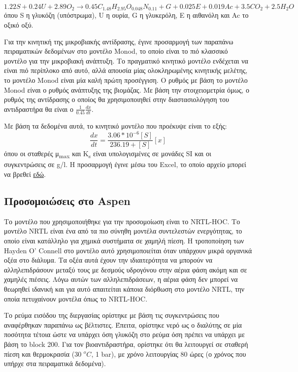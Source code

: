 \documentclass[11pt]{article}
\begin{document}
\[ 1.22 S + 0.24U + 2.89 O_2 \rightarrow 0.45 C_{1.48}H_{2.95}O_{0.048}N_{0.11} + G + 0.025E + 0.019Ac + 3.5CO_2 + 2.5H_2O \]
όπου S η γλυκόζη (υπόστρωμα), U η ουρία, G η γλυκερόλη, Ε η αιθανόλη και Ac το οξικό οξύ.

Για την κινητική της μικροβιακής αντίδρασης, έγινε προσαρμογή των παραπάνω πειραματικών δεδομένων στο μοντέλο Monod, το οποίο είναι το πιό κλασσικό μοντέλο για την μικροβιακή ανάπτυξη. Το πραγματικό κινητικό μοντέλο ενδέχεται να είναι πιό περίπλοκο από αυτό, αλλά απουσία μίας ολοκληρωμένης κινητικής μελέτης, το μοντέλο Monod είναι μία καλή πρώτη προσέγγιση. Ο ρυθμός με βάση το μοντέλο Monod είναι ο ρυθμός ανάπτυξης της βιομάζας. Με βάση την στοιχειομετρία όμως, ο ρυθμός της αντίδρασης ο οποίος θα χρησιμοποιηθεί στην διαστασιολόγηση του αντιδραστήρα θα είναι ο \(\frac{1}{0.45} \frac{dx}{dt}\).

Με βάση τα δεδομένα αυτά, το κινητικό μοντέλο που προέκυψε είναι το εξής:
\[ \frac{dx}{dt} = \frac{3.06*10^{-6}[S]}{236.19+[S]}[x] \] όπου οι σταθερές μ\textsubscript{max} και K\textsubscript{s} είναι υπολογισμένες σε μονάδες SI και οι συγκεντρώσεις σε g/l. Η προσαρμογή έγινε μέσω του Excel, το οποίο αρχείο μπορεί να βρεθεί \href{https://github.com/Vidianos-Giannitsis/Process-Design/blob/master/Calculations/c\_glycerinogenes\_kinetics.ods}{εδώ}.

\subsection{Προσομοιώσεις στο Aspen}
\label{sec:orgc1b71c5}
Το μοντέλο που χρησιμοποιήθηκε για την προσομοίωση είναι το NRTL-HOC. Το μοντέλο NRTL είναι ένα από τα πιο σύνηθη μοντέλα συντελεστών ενεργότητας, το οποίο είναι κατάλληλο για χημικά συστήματα σε χαμηλή πίεση. Η τροποποίηση των Hayden O' Connell στο μοντέλο αυτό χρησιμοποιείται όταν υπάρχουν μικρά οργανικά οξέα στο διάλυμα. Τα οξέα αυτά έχουν την ιδιαιτερότητα να μπορούν να αλληλεπιδράσουν μεταξύ τους με δεσμούς υδρογόνου στην αέρια φάση ακόμη και σε χαμηλές πιέσεις. Λόγω αυτών των αλληλεπιδράσεων, η αέρια φάση δεν μπορεί να θεωρηθεί ιδανική και για αυτό απαιτείται κάποια διόρθωση στο μοντέλο NRTL, την οποία πετυχαίνουν μοντέλα όπως το NRTL-HOC.

Το ρεύμα εισόδου της διεργασίας ορίστηκε με βάση τις συγκεντρώσεις που αναφέρθηκαν παραπάνω ως βέλτιστες. Έπειτα, ορίστηκε νερό ως ο διαλύτης σε μία ποσότητα τέτοια ώστε να υπάρχει όση γλυκόζη στο ρεύμα όση πρέπει να υπάρχει με βάση το block 200. Για τον βιοαντιδραστήρα, ορίστηκε ότι θα λειτουργεί σε σταθερή πίεση και θερμοκρασία (30 \(^oC\), 1 bar), με χρόνο λειτουργίας 80 ώρες (ο χρόνος που υπήρχε στα πειραματικά δεδομένα).
\end{document}
